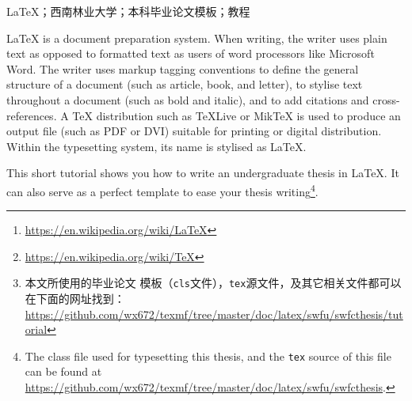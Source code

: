 \documentclass{swfuthesis}
\begin{document}
\maketitle %

\frontmatter

\begin{abstract} %
  \LaTeX{}\footnote{\url{https://en.wikipedia.org/wiki/LaTeX}}是一种基
  于\TeX{}\footnote{\url{https://en.wikipedia.org/wiki/TeX}}文件格式的
  排版系统，由美国电脑学家莱斯利·兰伯特在20世纪80年代初期开发。利用这种
  格式，即使用户没有排版和程序设计的知识，也可以充分利用\TeX{}所提供的
  强大功能，在几天，甚至几小时内生成很多具有书籍质量的印刷品。对于生成
  复杂表格和数学公式，这一点表现得尤为突出。因此它非常适用于生成高印刷
  质量的科技和数学类文档。这个系统同样适用于生成从简单如信件到完整如书
  籍的所有种类的文档\cite{wiki:latexcn}。

  本文对如何利用\LaTeX{}来撰写西南林业大学本科毕业论文做一个简要的介绍。
  读者也可以将本文作为毕业论文模板来使用\footnote{本文所使用的毕业论文
    模板（\texttt{cls}文件），\texttt{tex}源文件，及其它相关文件都可以
    在下面的网址找到：%
    \url{https://github.com/wx672/texmf/tree/master/doc/latex/swfu/swfcthesis/tutorial}}。
\end{abstract}

\begin{keyword} %
  \LaTeX{}；西南林业大学；本科毕业论文模板；教程
\end{keyword}

\begin{EAbstract} %
  \LaTeX{} is a document preparation system. When writing, the writer uses plain text as
  opposed to formatted text as users of word processors like Microsoft Word. The writer
  uses markup tagging conventions to define the general structure of a document (such as
  article, book, and letter), to stylise text throughout a document (such as bold and
  italic), and to add citations and cross-references. A \TeX{} distribution such as
  \TeX{}Live or Mik\TeX{} is used to produce an output file (such as PDF or DVI) suitable
  for printing or digital distribution. Within the typesetting system, its name is
  stylised as \LaTeX{}\cite{wiki:latex}.

  This short tutorial shows you how to write an undergraduate thesis in \LaTeX{}. It can
  also serve as a perfect template to ease your thesis writing\footnote{The class file
    used for typesetting this thesis, and the \texttt{tex} source of this file can be
    found at \url{https://github.com/wx672/texmf/tree/master/doc/latex/swfu/swfcthesis}.}.
\end{EAbstract}
\end{document}
